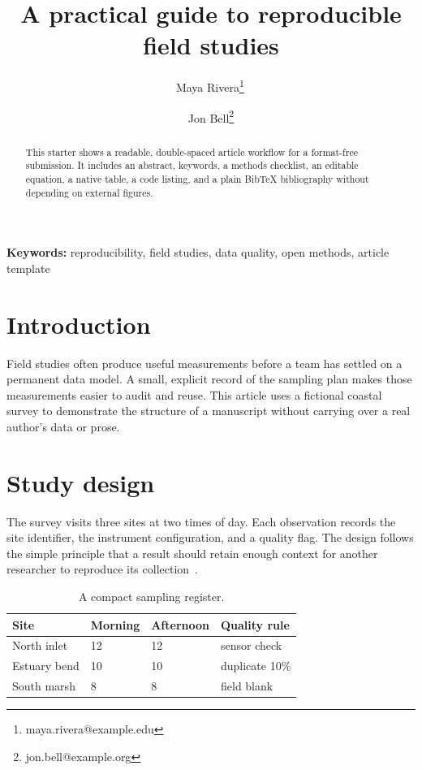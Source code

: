 \documentclass{getwriting}
\title{A practical guide to reproducible field studies}
\author[1]{Maya Rivera\thanks{maya.rivera@example.edu}\,\orcidlink{0000-0002-1825-0097}}
\author[2]{Jon Bell\thanks{jon.bell@example.org}}
\affil[1]{Centre for Environmental Data, Northbridge University}
\affil[2]{Open Methods Lab, Example Institute}
\begin{document}
\maketitle

\begin{abstract}
This starter shows a readable, double-spaced article workflow for a
format-free submission.  It includes an abstract, keywords, a methods
checklist, an editable equation, a native table, a code listing, and a
plain BibTeX bibliography without depending on external figures.
\end{abstract}

\noindent\textbf{Keywords:} reproducibility, field studies, data quality,
open methods, article template

\section{Introduction}
Field studies often produce useful measurements before a team has settled on
a permanent data model.  A small, explicit record of the sampling plan makes
those measurements easier to audit and reuse.  This article uses a fictional
coastal survey to demonstrate the structure of a manuscript without carrying
over a real author's data or prose.

\section{Study design}
The survey visits three sites at two times of day.  Each observation records
the site identifier, the instrument configuration, and a quality flag.  The
design follows the simple principle that a result should retain enough context
for another researcher to reproduce its collection~\cite{wilkinson2016}.

\begin{table}[H]
  \centering
  \caption{A compact sampling register.}
  \label{tab:register}
  \begin{tabular}{llll}
    \toprule
    Site & Morning & Afternoon & Quality rule \\
    \midrule
    North inlet & 12 & 12 & sensor check \\
    Estuary bend & 10 & 10 & duplicate 10\% \\
    South marsh & 8 & 8 & field blank \\
    \bottomrule
  \end{tabular}
\end{table}
\end{document}
